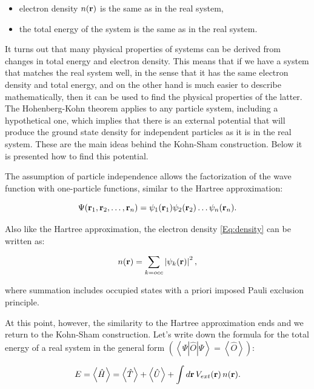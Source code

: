 \begin{itemize}
    \item electron density $n(\mathbf{r})$ is the same as in the real system,
    \item the total energy of the system is the same as in the real system.
\end{itemize}

It turns out that many physical properties of systems can be derived from changes in total energy and electron density.
This means that if we have a system that matches the real system well, in the sense that it has the same electron density and total energy, and on the other hand is much easier to describe mathematically, then it can be used to find the physical properties of the latter.
The Hohenberg-Kohn theorem applies to any particle system, including a hypothetical one, which implies that there is an external potential that will produce the ground state density for independent particles as it is in the real system. 
These are the main ideas behind the Kohn-Sham construction.
Below it is presented how to find this potential.

The assumption of particle independence allows the factorization of the wave function with one-particle functions, similar to the Hartree approximation:

\begin{equation}
    \label{Eq:hartree_wf_ks}
    \Psi(\mathbf{r}_1, \mathbf{r}_2, \dots,\mathbf{r}_n)=\psi_1(\mathbf{r}_1)\psi_2(\mathbf{r}_2)\dots\psi_n(\mathbf{r}_n).
\end{equation}

Also like the Hartree approximation, the electron density \ref{Eq:density} can be written as:

\begin{equation}
    \label{Eq:density_sum_wfs2}
    n(\mathbf{r})=\sum_{k=occ}\left|\psi_k(\mathbf{r})\right|^2,
\end{equation}

where summation includes occupied states with a priori imposed Pauli exclusion principle.

At this point, however, the similarity to the Hartree approximation ends and we return to the Kohn-Sham construction.
Let's write down the formula for the total energy of a real system in the general form $\left(\left<\Psi\left|\hat{O}\right|\Psi\right>=\left<\hat{O}\right>\right)$:

\begin{equation}
    \label{KS10}
    E=\left<\hat{H}\right>=\left<\hat{T}\right>+\left<\hat{U}\right>+\int d\mathbf{r}\,V_{ext}(\mathbf{r})\,n(\mathbf{r}).
\end{equation}

